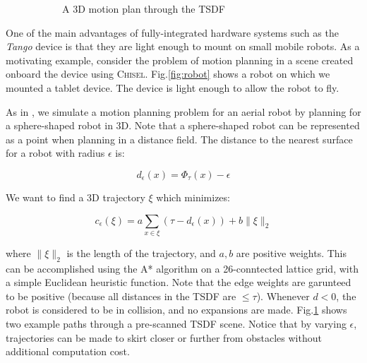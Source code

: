 \documentclass[conference]{IEEEtran}
\newcommand{\figref}[1]{Fig.\ref{#1}}
\newcommand{\Tango}{\textit{Tango} }
\newcommand{\chisel}{\textsc{Chisel}\xspace}
\begin{document}
\begin{figure}
\begin{subfigure}{1.0\columnwidth}
	 \caption{A 3D motion plan through the TSDF}
	 \label{fig:path_plan}
	 \end{subfigure}
      \caption{}
  \label{fig:robot_figure}
\end{figure} 
 One of the main advantages of fully-integrated hardware systems such as the
\Tango device is that they are light enough to mount on small mobile
 robots. As a motivating example, consider the problem of motion planning in
 a scene created onboard the device using \chisel. \figref{fig:robot} shows a
 robot on which we mounted a tablet device. The device is light enough to allow
 the robot to fly.
 
 As in \cite{FlyingNavigation}, we simulate a motion planning problem for an
 aerial robot by planning for a sphere-shaped robot in 3D. Note that a sphere-shaped robot can be
 represented as a point when planning in a distance field. The distance to the
 nearest surface for a robot with radius $\epsilon$ is:
 
 \begin{equation}
   d_{\epsilon}(x) = \Phi_\tau(x) - \epsilon
 \end{equation}
 
 \noindent We want to find a 3D trajectory $\xi$ which minimizes:
 
 \begin{equation}
      c_{\epsilon}(\xi) = a \sum_{x \in \xi} \left(\tau -
      d_{\epsilon}(x)\right) + b\|\xi\|_2
 \end{equation} 
 
\noindent where $\|\xi\|_2$ is the length of the trajectory, and $a, b$ are
positive weights. This can be accomplished using the A* algorithm on a
26-conntected lattice grid, with a simple Euclidean heuristic function. Note
that the edge weights are garunteed to be positive (because all distances in the
TSDF are $\leq\tau$). Whenever $d < 0$, the robot is considered to be in
collision, and no expansions are made.
\figref{fig:path_plan} shows two example paths through a pre-scanned TSDF scene.
Notice that by varying $\epsilon$, trajectories can be made to skirt closer or further from obstacles without
additional computation cost.
 
\end{document}
